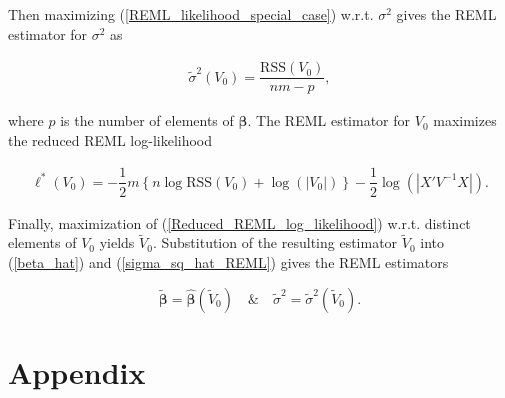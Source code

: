 \documentclass[11pt, a4paper]{article}
\newcommand{\bs}[1]{\boldsymbol{#1}}
\begin{document}
Then maximizing (\ref{REML_likelihood_special_case}) w.r.t. $\sigma^2$ gives the REML estimator for $\sigma^2$ as

\begin{align}\label{sigma_sq_hat_REML}
\widetilde{\sigma}^{2}(V_0)
=
\dfrac{
\text{RSS}(V_0)
}{
nm-p
},
\end{align}

where $p$ is the number of elements of $\bs{\beta}$. The REML estimator for $V_0$ maximizes the reduced REML log-likelihood

\begin{align}\label{Reduced_REML_log_likelihood}
\ell^{*}(V_0)
=
-\dfrac{1}{2}
m
\left\{
n\log \text{RSS}(V_0)
+
\log\!\left(
\lvert V_0 \rvert
\right)
\right\}
-
\dfrac{1}{2}
\log\!\left(
\left\lvert
X'V^{-1}X
\right\rvert
\right).
\end{align}


Finally, maximization of (\ref{Reduced_REML_log_likelihood}) w.r.t. distinct elements of $V_0$ yields $\widetilde{V}_0$. Substitution of the resulting estimator $\widetilde{V}_0$ into (\ref{beta_hat}) and (\ref{sigma_sq_hat_REML}) gives the REML estimators

\[
\widetilde{\bs{\beta}}
=
\widehat{\bs{\beta}}(\widetilde{V}_0)
\quad \& \quad
\widetilde{\sigma}^{2}
=
\widetilde{\sigma}^{2}(\widetilde{V}_0).
\]

\section*{Appendix}

\appendix










\end{document}
